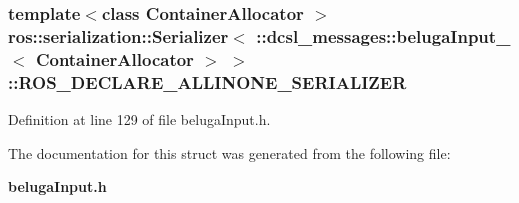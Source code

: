 \subsubsection[{\-R\-O\-S\-\_\-\-D\-E\-C\-L\-A\-R\-E\-\_\-\-A\-L\-L\-I\-N\-O\-N\-E\-\_\-\-S\-E\-R\-I\-A\-L\-I\-Z\-E\-R}]{\setlength{\rightskip}{0pt plus 5cm}template$<$class Container\-Allocator $>$ ros\-::serialization\-::\-Serializer$<$ \-::{\bf dcsl\-\_\-messages\-::beluga\-Input\-\_\-}$<$ \-Container\-Allocator $>$ $>$\-::{\bf \-R\-O\-S\-\_\-\-D\-E\-C\-L\-A\-R\-E\-\_\-\-A\-L\-L\-I\-N\-O\-N\-E\-\_\-\-S\-E\-R\-I\-A\-L\-I\-Z\-E\-R}}\label{structros_1_1serialization_1_1Serializer_3_01_1_1dcsl__messages_1_1belugaInput___3_01ContainerAllocator_01_4_01_4_aafc5350a6bb45c5c63ac13f158b14358}


\-Definition at line 129 of file beluga\-Input.\-h.



\-The documentation for this struct was generated from the following file\-:\begin{DoxyCompactItemize}
\item 
{\bf beluga\-Input.\-h}\end{DoxyCompactItemize}
